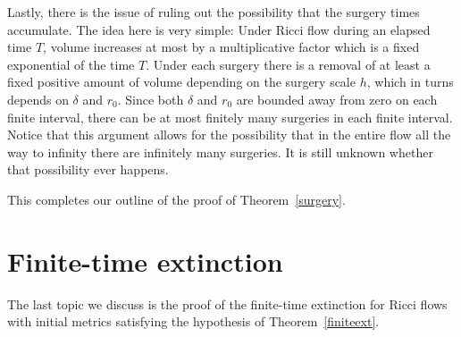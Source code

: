 Lastly, there is the issue of ruling out the possibility that the surgery times
accumulate. The idea here is very simple: Under Ricci flow during an elapsed
time $T$, volume increases at most by a  multiplicative factor which is a fixed
exponential of the time $T$. Under each surgery there is a removal of at least
a fixed positive amount of volume depending on the surgery scale $h$, which in
turns depends on $\delta$ and $r_0$. Since both $\delta$ and $r_0$ are bounded
away from zero on each finite interval, there can be at most finitely many
surgeries in each finite interval. Notice that this argument allows for the
possibility that in the entire flow all the way to infinity there are
infinitely many surgeries. It is still unknown whether that possibility ever
happens.

This completes our outline of the proof of Theorem~\ref{surgery}.



\section{Finite-time extinction}

The last topic we discuss is the  proof of the finite-time
extinction for Ricci flows with
initial metrics satisfying the hypothesis  of
Theorem~\ref{finiteext}.


